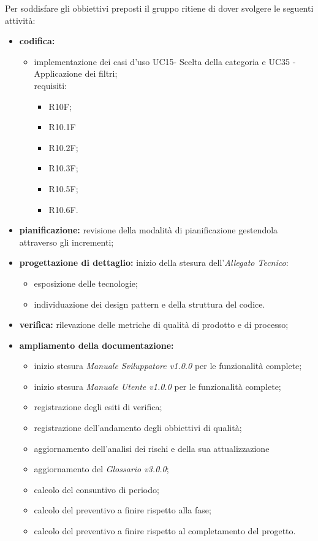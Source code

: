 Per soddisfare gli obbiettivi preposti il gruppo ritiene di dover svolgere le seguenti attività:
\begin{itemize}
    \item \textbf{codifica:}
          \begin{itemize}
              \item implementazione dei casi d'uso UC15- Scelta della categoria e UC35 - Applicazione dei filtri;\\ requisiti:
                    \begin{itemize}
                        \item R10F;                                                                   \item R10.1F
                        \item R10.2F;
                        \item R10.3F;
                        \item R10.5F;
                        \item R10.6F.
                    \end{itemize}
          \end{itemize}
    \item \textbf{pianificazione:} revisione della modalità di pianificazione gestendola attraverso gli incrementi;
    \item \textbf{progettazione di dettaglio:} inizio della stesura dell'\textit{Allegato Tecnico}:
          \begin{itemize}
              \item esposizione delle tecnologie;
              \item individuazione dei design pattern e della struttura del codice.
          \end{itemize}
    \item \textbf{verifica:} rilevazione delle metriche di qualità di prodotto e di processo;
    \item \textbf{ampliamento della documentazione:}
          \begin{itemize}
              \item inizio stesura \textit{Manuale Sviluppatore v1.0.0} per le funzionalità complete;
              \item inizio stesura \textit{Manuale Utente v1.0.0} per le funzionalità complete;
              \item registrazione degli esiti di verifica;
              \item registrazione dell'andamento degli obbiettivi di qualità;
              \item aggiornamento dell'analisi dei rischi e della sua attualizzazione
              \item aggiornamento del \textit{Glossario v3.0.0};
              \item calcolo del consuntivo di periodo;
              \item calcolo del preventivo a finire rispetto alla fase;
              \item calcolo del preventivo a finire rispetto al completamento del progetto.
          \end{itemize}
\end{itemize}

